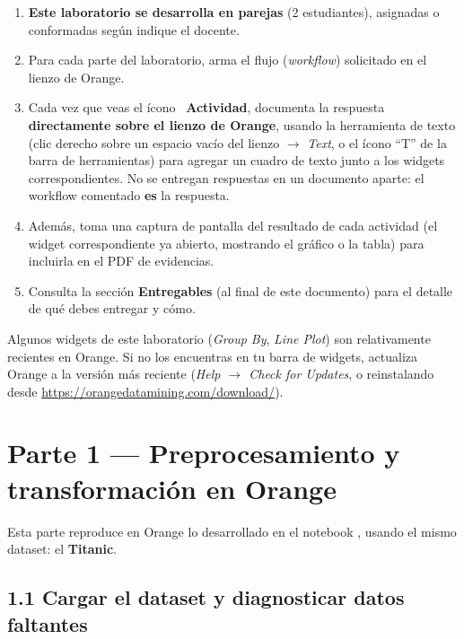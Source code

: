 \documentclass[11pt,letterpaper]{article}
\newcommand{\faPencil}{\raisebox{-0.1em}{\textbf{\Large\textbullet}}}
\begin{document}
\begin{enumerate}[leftmargin=1.2cm]
  \item \textbf{Este laboratorio se desarrolla en parejas} (2 estudiantes), asignadas o conformadas según indique el docente.
  \item Para cada parte del laboratorio, arma el flujo (\textit{workflow}) solicitado en el lienzo de Orange.
  \item Cada vez que veas el ícono \faPencil\ \textbf{Actividad}, documenta la respuesta \textbf{directamente sobre el lienzo de Orange}, usando la herramienta de texto (clic derecho sobre un espacio vacío del lienzo $\to$ \textit{Text}, o el ícono ``T'' de la barra de herramientas) para agregar un cuadro de texto junto a los widgets correspondientes. No se entregan respuestas en un documento aparte: el workflow comentado \textbf{es} la respuesta.
  \item Además, toma una captura de pantalla del resultado de cada actividad (el widget correspondiente ya abierto, mostrando el gráfico o la tabla) para incluirla en el PDF de evidencias.
  \item Consulta la sección \textbf{Entregables} (al final de este documento) para el detalle de qué debes entregar y cómo.
\end{enumerate}

\begin{nota}
Algunos widgets de este laboratorio (\textit{Group By}, \textit{Line Plot}) son relativamente recientes en Orange. Si no los encuentras en tu barra de widgets, actualiza Orange a la versión más reciente (\textit{Help $\to$ Check for Updates}, o reinstalando desde \url{https://orangedatamining.com/download/}).
\end{nota}

\section{Parte 1 --- Preprocesamiento y transformación en Orange}

Esta parte reproduce en Orange lo desarrollado en el notebook \texttt{}, usando el mismo dataset: el \textbf{Titanic}.

\subsection{1.1 Cargar el dataset y diagnosticar datos faltantes}
\end{document}
